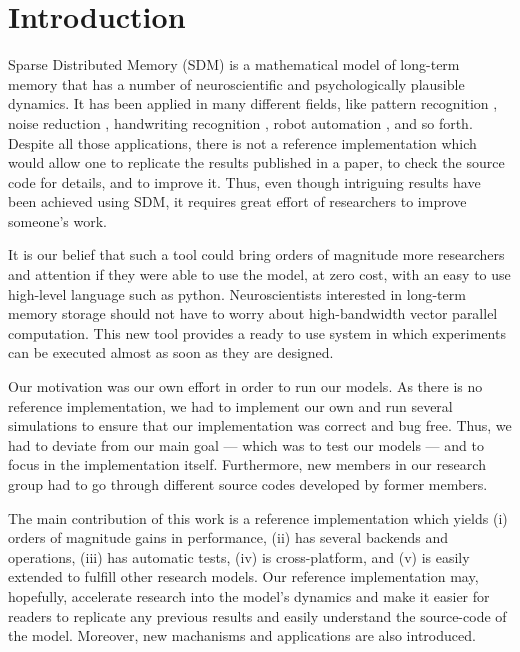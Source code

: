 
\chapter{Introduction}

Sparse Distributed Memory (SDM) \citep{Kanerva1988} is a mathematical model of long-term memory that has a number of neuroscientific and psychologically plausible dynamics. It has been applied in many different fields, like pattern recognition \citep{norman2003modeling, rao1995natural}, noise reduction \citep{Meng2009}, handwriting recognition \citep{fan1997genetic}, robot automation \citep{Rajesh1998, mendes2008robot}, and so forth. Despite all those applications, there is not a reference implementation which would allow one to replicate the results published in a paper, to check the source code for details, and to improve it. Thus, even though intriguing results have been achieved using SDM, it requires great effort of researchers to improve someone's work.

It is our belief that such a tool could bring orders of magnitude more researchers and attention if they were able to use the model, at zero cost, with an easy to use high-level language such as python. Neuroscientists interested in long-term memory storage should not have to worry about high-bandwidth vector parallel computation.  This new tool provides a ready to use system in which experiments can be executed almost as soon as they are designed.

Our motivation was our own effort in order to run our models. As there is no reference implementation, we had to implement our own and run several simulations to ensure that our implementation was correct and bug free. Thus, we had to deviate from our main goal --- which was to test our models --- and to focus in the implementation itself. Furthermore, new members in our research group had to go through different source codes developed by former members.

The main contribution of this work is a reference implementation which yields (i) orders of magnitude gains in performance, (ii) has several backends and operations, (iii) has automatic tests, (iv) is cross-platform, and (v) is easily extended to fulfill other research models. Our reference implementation may, hopefully, accelerate research into the model's dynamics and make it easier for readers to replicate any previous results and easily understand the source-code of the model.  Moreover, new machanisms and applications are also introduced.

